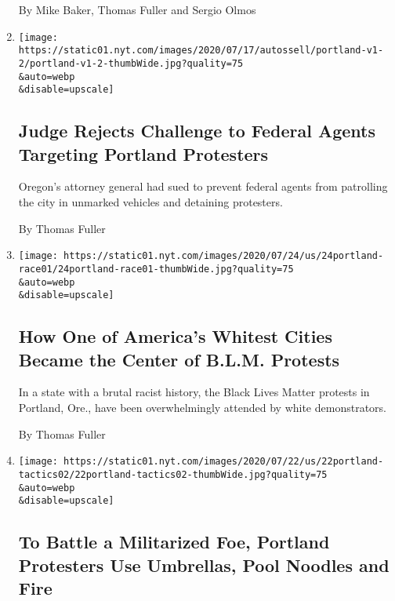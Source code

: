 \begin{enumerate}
  By Mike Baker, Thomas Fuller and Sergio Olmos
\item
  \href{/2020/07/24/us/portland-federal-jurisdiction-court-judge.html}{}

  \texttt{[image: https://static01.nyt.com/images/2020/07/17/autossell/portland-v1-2/portland-v1-2-thumbWide.jpg?quality=75\\\&auto=webp\\\&disable=upscale]}

  \hypertarget{judge-rejects-challenge-to-federal-agents-targeting-portland-protesters}{%
  \subsection{Judge Rejects Challenge to Federal Agents Targeting
  Portland
  Protesters}\label{judge-rejects-challenge-to-federal-agents-targeting-portland-protesters}}

  Oregon's attorney general had sued to prevent federal agents from
  patrolling the city in unmarked vehicles and detaining protesters.

  By Thomas Fuller
\item
  \href{/2020/07/24/us/portland-oregon-protests-white-race.html}{}

  \texttt{[image: https://static01.nyt.com/images/2020/07/24/us/24portland-race01/24portland-race01-thumbWide.jpg?quality=75\\\&auto=webp\\\&disable=upscale]}

  \hypertarget{how-one-of-americas-whitest-cities-became-the-center-of-blm-protests}{%
  \subsection{How One of America's Whitest Cities Became the Center of
  B.L.M.
  Protests}\label{how-one-of-americas-whitest-cities-became-the-center-of-blm-protests}}

  In a state with a brutal racist history, the Black Lives Matter
  protests in Portland, Ore., have been overwhelmingly attended by white
  demonstrators.

  By Thomas Fuller
\item
  \href{/2020/07/22/us/portland-protest-tactics.html}{}

  \texttt{[image: https://static01.nyt.com/images/2020/07/22/us/22portland-tactics02/22portland-tactics02-thumbWide.jpg?quality=75\\\&auto=webp\\\&disable=upscale]}

  \hypertarget{to-battle-a-militarized-foe-portland-protesters-use-umbrellas-pool-noodles-and-fire}{%
  \subsection{To Battle a Militarized Foe, Portland Protesters Use
  Umbrellas, Pool Noodles and
  Fire}\label{to-battle-a-militarized-foe-portland-protesters-use-umbrellas-pool-noodles-and-fire}}


\end{enumerate}
